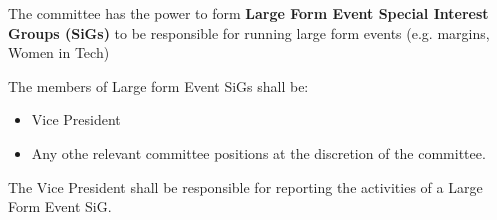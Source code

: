 \begin{clause}
    The committee has the power to form \textbf{Large Form Event Special Interest Groups (SiGs)} to be responsible for running large form events (e.g. margins, Women in Tech)
\end{clause}

\begin{subclause}
    The members of Large form Event SiGs shall be:
    \begin{itemize}
        \item Vice President
        \item Any othe relevant committee positions at the discretion of the committee.
    \end{itemize}
\end{subclause}

\begin{subclause}
    The Vice President shall be responsible for reporting the activities of a Large Form Event SiG.
\end{subclause}